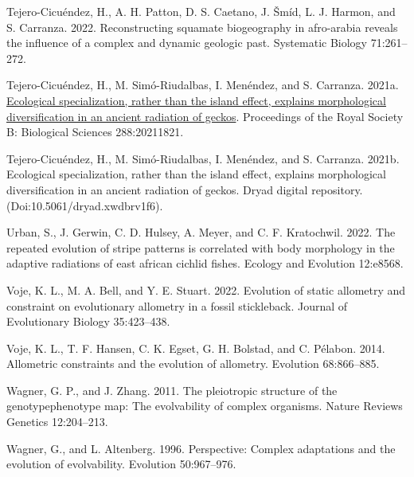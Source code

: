 \documentclass[
  11pt,
]{article}
\newlength{\cslhangindent}
\newlength{\cslentryspacingunit} %
\newenvironment{CSLReferences}[2] %
 {%
  \setlength{\parindent}{0pt}
  \ifodd #1
  \let\oldpar\par
  \def\par{\hangindent=\cslhangindent\oldpar}
  \fi
  \setlength{\parskip}{#2\cslentryspacingunit}
 }%
 {}
\begin{document}
\begin{CSLReferences}{1}{0}
\leavevmode{}%
Tejero-Cicuéndez, H., A. H. Patton, D. S. Caetano, J. Šmíd, L. J.
Harmon, and S. Carranza. 2022. Reconstructing squamate biogeography in
afro-arabia reveals the influence of a complex and dynamic geologic
past. Systematic Biology 71:261--272.

\leavevmode{}%
Tejero-Cicuéndez, H., M. Simó-Riudalbas, I. Menéndez, and S. Carranza.
2021a. \href{https://doi.org/10.1098/rspb.2021.1821}{Ecological
specialization, rather than the island effect, explains morphological
diversification in an ancient radiation of geckos}. Proceedings of the
Royal Society B: Biological Sciences 288:20211821.

\leavevmode{}%
Tejero-Cicuéndez, H., M. Simó-Riudalbas, I. Menéndez, and S. Carranza.
2021b. Ecological specialization, rather than the island effect,
explains morphological diversification in an ancient radiation of
geckos. Dryad digital repository. (Doi:10.5061/dryad.xwdbrv1f6).

\leavevmode{}%
Urban, S., J. Gerwin, C. D. Hulsey, A. Meyer, and C. F. Kratochwil.
2022. The repeated evolution of stripe patterns is correlated with body
morphology in the adaptive radiations of east african cichlid fishes.
Ecology and Evolution 12:e8568.

\leavevmode{}%
Voje, K. L., M. A. Bell, and Y. E. Stuart. 2022. Evolution of static
allometry and constraint on evolutionary allometry in a fossil
stickleback. Journal of Evolutionary Biology 35:423--438.

\leavevmode{}%
Voje, K. L., T. F. Hansen, C. K. Egset, G. H. Bolstad, and C. Pélabon.
2014. Allometric constraints and the evolution of allometry. Evolution
68:866--885.

\leavevmode{}%
Wagner, G. P., and J. Zhang. 2011. The pleiotropic structure of the
genotype{\textendash}phenotype map: The evolvability of complex
organisms. Nature Reviews Genetics 12:204--213.

\leavevmode{}%
Wagner, G., and L. Altenberg. 1996. Perspective: Complex adaptations and
the evolution of evolvability. Evolution 50:967--976.

\end{CSLReferences}
\end{document}
